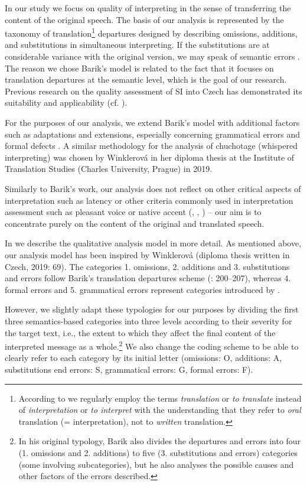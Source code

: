 \documentclass[output=paper]{langscibook}
\begin{document}
In our study we focus on quality of interpreting in the sense of transferring the content of the original speech. The basis of our analysis is represented by the taxonomy of translation\footnote{{According to \citet{Barik1971} we regularly employ the terms} {\textit{translation}} {or} {\textit{to translate}} {instead of} {\textit{interpretation}} {or} {\textit{to interpret} }{with the understanding that they refer to} {\textit{oral}} {translation (= interpretation), not to} {\textit{written}} {translation.}} departures designed by \citet{Barik1971} describing omissions, additions, and substitutions in simultaneous interpreting. If the substitutions are at considerable variance with the original version, we may speak of semantic errors \citep[199]{Barik1971}. The reason we chose Barik’s model is related to the fact that it focuses on translation departures at the semantic level, which is the goal of our research. Previous research on the quality assessment of SI into Czech has demonstrated its suitability and applicability (cf. \citealt{Winklerová2019}).

For the purposes of our analysis, we extend Barik’s model with additional factors such as adaptations and extensions, especially concerning grammatical errors and formal defects \citep{Kopczyński1980}. A similar methodology for the analysis of chuchotage (whispered interpreting) was chosen by Winklerová in her diploma thesis at the Institute of Translation Studies (Charles University, Prague) in 2019.

Similarly to Barik’s work, our analysis does not reflect on other critical aspects of interpretation such as latency or other criteria commonly used in interpretation assessment such as pleasant voice or native accent (\citealt{Bühler1986}, \citealt{Kurz1993}, \citealt{PöchhackerZwischenberger2010}) – our aim is to concentrate purely on the content of the original and translated speech.

In  we describe the qualitative analysis model in more detail. As mentioned above, our analysis model has been inspired by Winklerová (diploma thesis written in Czech, 2019: 69). The categories 1. omissions, 2. additions and 3. substitutions and errors follow Barik’s translation departures scheme (\citealt{Barik1971}: 200–207), whereas 4. formal errors and 5. grammatical errors represent categories introduced by \citet{Kopczyński1980}.

However, we slightly adapt these typologies for our purposes by dividing the first three semantics-based categories into three levels according to their severity for the target text, i.e., the extent to which they affect the final content of the interpreted message as a whole.\footnote{{In his original typology, Barik also divides the departures and errors into four (1. omissions and 2. additions) to five (3. substitutions and errors) categories (some involving subcategories), but he also analyses the possible causes and other factors of the errors described.}} We also change the coding scheme to be able to clearly refer to each category by its initial letter (omissions: O, additions: A, substitutions end errors: S, grammatical errors: G, formal errors: F).
\end{document}
